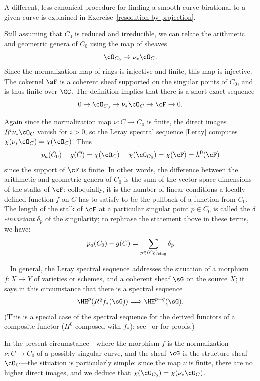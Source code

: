 A different, less canonical procedure for finding a smooth curve birational to a given curve
is explained in Exercise~\ref{resolution by projection}.


Still assuming that $C_0$ is reduced and irreducible, we can relate the arithmetic and geometric genera of $C_0$ using the map of sheaves
$$
\cO_{C_0} \to \nu_*\cO_C.
$$
Since the normalization map of rings  is injective and finite, this map is injective. The cokernel $\sF$ is a coherent sheaf supported on the singular points of $C_0$, and is thus finite over $\CC$. 
The definition implies that there is a short exact sequence
$$
0 \to \cO_{C_0} \to \nu_*\cO_C \to \cF \to 0.
$$

Again since the normalization map $\nu: C \to C_0$ is finite,  the direct images $R^i\nu_*\cO_C$ vanish for $i > 0$, 
so the Leray spectral sequence \ref{Leray} computes $\chi(\nu_*\cO_C) = \chi(\cO_C)$. Thus
$$
p_a(C_0) - g(C) =  \chi(\cO_{C}) -   \chi(\cO_{C_0}) = \chi(\cF) = h^0(\cF) 
$$ 
since the support of $\cF$ is finite.
In other words, the difference between the arithmetic and geometric genera of $C_0$ is the sum of the vector space dimensions of the stalks of $\cF$; colloquially, it is the number of linear conditions a locally defined function $f$ on $C$ has to satisfy to be the pullback of a function from $C_0$. The length of the stalk of $\cF$ at a particular singular point $p \in C_0$ is called the \emph{$\delta$-invariant} $\delta_p$ of the singularity; to rephrase the statement above in these terms, we have:
$$
p_a(C_0) - g(C) = \sum_{p \in (C_0)_{\rm sing}} \delta_p
$$ 

\begin{fact}~\label{Leray}
 In general, the Leray spectral sequence addresses the situation of  a morphism $f:X\to Y$ of varieties or schemes, 
 and a coherent sheaf $\sG$  on the source $X$; it says in this circumstance that there is a spectral sequence
  $$
  \HH^p(R^qf_*(\sG)) \Longrightarrow \HH^{p+q}(\sG).
  $$
(This is a special case of the spectral sequence for the derived functors of a composite functor ($H^0$ composed with $f_*$);
see~\cite[II.4.17.1]{Godement} or \cite[Section III.7]{Gelfand-Manin} for proofs.)

In the present circumstance---where the morphism $f$ is the normalization $\nu : C \to C_0$ of a possibly singular curve, and the sheaf $\cG$ is the structure sheaf $\cO_C$---the situation is particularly simple: since the map $\nu$ is finite, there are no higher direct images, and we deduce that $\chi(\cO_{C_0}) = \chi(\nu_*\cO_C)$.
\end{fact}

